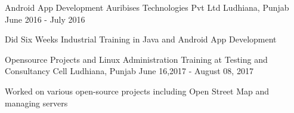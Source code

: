 


\begin{cventries}


\cventry
{Android App Development} %
{Auribises Technologies Pvt Ltd } %
{Ludhiana, Punjab } %
{June 2016 - July 2016} %
{ %
\begin{cvitems}
\item {Did Six Weeks Industrial Training in Java and Android App Development }
\end{cvitems}
}
\cventry
{Opensource Projects and Linux Administration} %
{Training at Testing and Consultancy Cell} %
{Ludhiana, Punjab } %
{June 16,2017 - August 08, 2017} %
{ %
\begin{cvitems}
\item {Worked on various open-source projects including Open Street Map and managing servers}
\end{cvitems}
}
\end{cventries}






